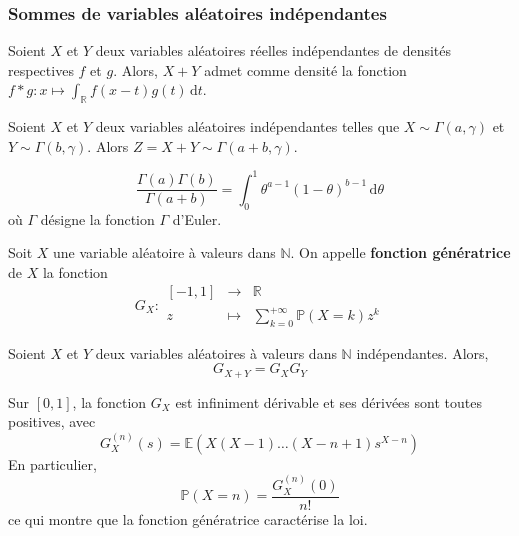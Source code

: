   \subsubsection{Sommes de variables aléatoires indépendantes}


  \begin{theorem}
    Soient $X$ et $Y$ deux variables aléatoires réelles indépendantes de densités respectives $f$ et $g$. Alors, $X + Y$ admet comme densité la fonction $f * g : x \mapsto \int_{\mathbb{R}} f(x-t) g(t) \, \mathrm{d}t$.
  \end{theorem}

  \begin{application}
    Soient $X$ et $Y$ deux variables aléatoires indépendantes telles que $X \sim \Gamma(a, \gamma)$ et $Y \sim \Gamma(b, \gamma)$. Alors $Z = X + Y \sim \Gamma(a+b, \gamma)$.
  \end{application}

  \begin{application}
    \[ \frac{\Gamma(a) \Gamma(b)}{\Gamma(a+b)} = \int_0^1 \theta^{a-1} (1-\theta)^{b-1} \, \mathrm{d}\theta \]
    où $\Gamma$ désigne la fonction $\Gamma$ d'Euler.
  \end{application}


  \begin{definition}
    Soit $X$ une variable aléatoire à valeurs dans $\mathbb{N}$. On appelle \textbf{fonction génératrice} de $X$ la fonction
    \[
    G_X :
    \begin{array}{ccc}
      [-1,1] &\rightarrow& \mathbb{R} \\
      z &\mapsto& \sum_{k=0}^{+\infty} \mathbb{P}(X=k) z^k
    \end{array}
    \]
  \end{definition}

  \begin{proposition}
    Soient $X$ et $Y$ deux variables aléatoires à valeurs dans $\mathbb{N}$ indépendantes. Alors,
    \[ G_{X+Y} = G_X G_Y \]
  \end{proposition}

  \begin{theorem}
    Sur $[0,1]$, la fonction $G_X$ est infiniment dérivable et ses dérivées sont toutes positives, avec
    \[ G_X^{(n)}(s) = \mathbb{E}(X(X-1) \dots (X-n+1)s^{X-n}) \]
    En particulier,
    \[ \mathbb{P}(X=n) = \frac{G_X^{(n)}(0)}{n!} \]
    ce qui montre que la fonction génératrice caractérise la loi.
  \end{theorem}

